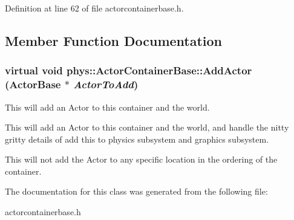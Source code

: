 Definition at line 62 of file actorcontainerbase.h.



\subsection{Member Function Documentation}
\hypertarget{classphys_1_1ActorContainerBase_a8dd213cba4915f68ac421fc9f341cbbe}{
\subsubsection[{AddActor}]{\setlength{\rightskip}{0pt plus 5cm}virtual void phys::ActorContainerBase::AddActor ({\bf ActorBase} $\ast$ {\em ActorToAdd})}}
\label{d1/d00/classphys_1_1ActorContainerBase_a8dd213cba4915f68ac421fc9f341cbbe}


This will add an Actor to this container and the world. 

This will add an Actor to this container and the world, and handle the nitty gritty details of add this to physics subsystem and graphics subsystem. \par
\par
 This will not add the Actor to any specific location in the ordering of the container. 

The documentation for this class was generated from the following file:\begin{DoxyCompactItemize}
\item 
actorcontainerbase.h\end{DoxyCompactItemize}
